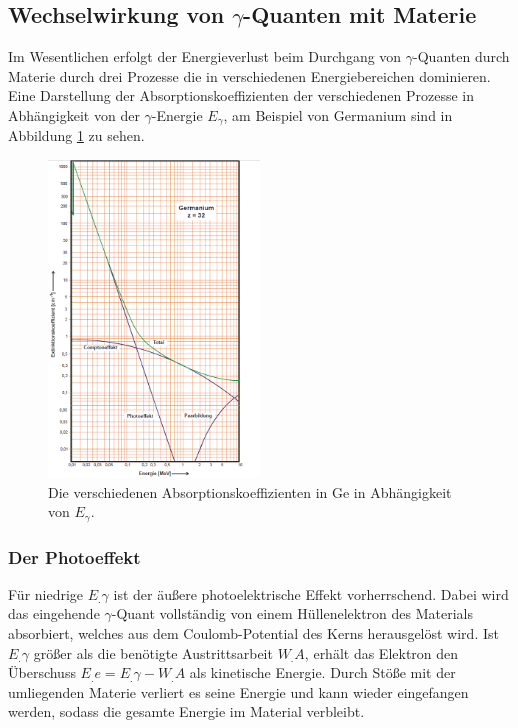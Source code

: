 \subsection{Wechselwirkung von $\gamma$-Quanten mit Materie}
\label{subsec:WW}

Im Wesentlichen erfolgt der Energieverlust beim Durchgang von $\gamma$-Quanten durch Materie durch drei Prozesse die in verschiedenen Energiebereichen dominieren.
Eine Darstellung der Absorptionskoeffizienten der verschiedenen Prozesse in Abhängigkeit von der $\gamma$-Energie $E_{\gamma}$, am Beispiel von Germanium sind in Abbildung \ref{fig:mus} zu sehen.
\begin{figure}
\centering
\includegraphics[keepaspectratio, width=0.5\textwidth]{content/images/sigma.png}
\caption{Die verschiedenen Absorptionskoeffizienten in Ge in Abhängigkeit von $E_{\gamma}$.\cite{V18}}
\label{fig:mus}
\end{figure}

\subsubsection{Der Photoeffekt}

Für niedrige $E_.{\gamma}$ ist der äußere photoelektrische Effekt vorherrschend.
Dabei wird das eingehende $\gamma$-Quant vollständig von einem Hüllenelektron des Materials absorbiert, welches aus dem Coulomb-Potential des Kerns herausgelöst wird. Ist $E_.{\gamma}$ größer als die benötigte Austrittsarbeit $W_.A$, erhält das Elektron den Überschuss $E_.e = E_.{\gamma} - W_.A$ als kinetische Energie. Durch Stöße mit der umliegenden Materie verliert es seine Energie und kann wieder eingefangen werden, sodass die gesamte Energie im Material verbleibt.

